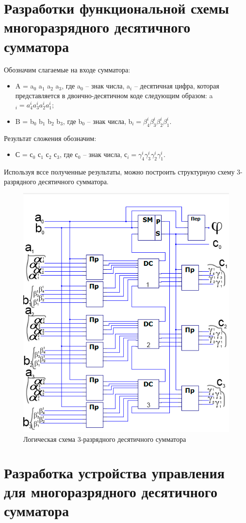 \documentclass[a4paper,14pt]{article}
\begin{document}
\section{Разработки функциональной схемы многоразрядного десятичного сумматора}

Обозначим слагаемые на входе сумматора:

\begin{itemize}	
	\item A = a$_0$ a$_1$ a$_2$ a$_3$, где a$_0$ -- знак числа, a$_i$ -- десятичная цифра, которая представляется в двоично-десятичном коде следующим образом:
	a$_i = a^i_4 a^i_3 a^i_2 a^i_1$;
	
	\item B = b$_0$ b$_1$ b$_2$ b$_3$, где b$_0$ -- знак числа, b$_i = \beta^i_4 \beta^i_3 \beta^i_2 \beta^i_1$.	
\end{itemize}

Результат сложения обозначим:
\begin{itemize}	
	\item С = с$_0$ с$_1$ с$_2$ с$_3$, где с$_0$ -- знак числа, с$_i = \gamma^i_4 \gamma^i_3 \gamma^i_2 \gamma^i_1$.	
\end{itemize}

Используя вссе полученные результаты, можно построить структурную схему 3-разрядного десятичного сумматора.

\begin{figure}[H]
	\centering
	\includegraphics[width=0.5\linewidth]{images/3razrSum}
	\caption{Логическая схема 3-разрядного десятичного сумматора}
	\label{fig:3razrSum}
\end{figure}



\section{Разработка устройства управления для многоразрядного десятичного сумматора}
\end{document}

